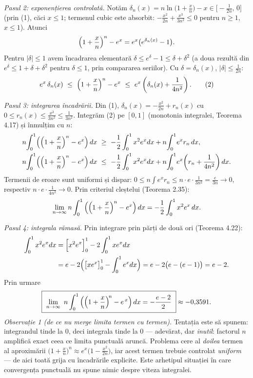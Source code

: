 \emph{Pasul 2: exponențierea controlată.} Notăm $\delta_{n}(x)=n\ln\bigl(1+\frac xn\bigr)-x\in\bigl[-\frac{1}{2n},\,0\bigr]$ (prin (1), căci $x\le1$; termenul cubic este absorbit: $-\frac{x^2}{2n}+\frac{x^3}{3n^2}\le0$ pentru $n\ge1$, $x\le1$). Atunci
\[ \Bigl(1+\frac xn\Bigr)^{n}-e^{x}=e^{x}\bigl(e^{\delta_{n}(x)}-1\bigr) . \]
Pentru $|\delta|\le1$ avem încadrarea elementară $\delta\le e^{\delta}-1\le\delta+\delta^{2}$ (a doua rezultă din $e^{\delta}\le1+\delta+\delta^{2}$ pentru $\delta\le1$, prin compararea seriilor). Cu $\delta=\delta_{n}(x)$, $|\delta|\le\frac{1}{2n}$:
\[ e^{x}\,\delta_{n}(x)\ \le\ \Bigl(1+\frac xn\Bigr)^{n}-e^{x}\ \le\ e^{x}\left(\delta_{n}(x)+\frac{1}{4n^{2}}\right) . \tag{2} \]

\emph{Pasul 3: integrarea încadrării.} Din (1), $\delta_{n}(x)=-\frac{x^{2}}{2n}+r_{n}(x)$ cu $0\le r_{n}(x)\le\frac{x^{3}}{3n^{2}}\le\frac{1}{3n^{2}}$. Integrăm (2) pe $[0,1]$ (monotonia integralei, Teorema 4.17) și înmulțim cu $n$:
\[ \begin{aligned} n\!\int_{0}^{1}\!\left(\Bigl(1+\frac xn\Bigr)^{n}-e^{x}\right)dx&\ \ge\ -\frac12\int_{0}^{1}x^{2}e^{x}dx+n\!\int_{0}^{1}\!e^{x}r_{n}\,dx,\\ n\!\int_{0}^{1}\!\left(\Bigl(1+\frac xn\Bigr)^{n}-e^{x}\right)dx&\ \le\ -\frac12\int_{0}^{1}x^{2}e^{x}dx+n\!\int_{0}^{1}\!e^{x}\!\left(r_{n}+\frac{1}{4n^{2}}\right)dx . \end{aligned} \]
Termenii de eroare sunt uniformi și dispar: $0\le n\int e^{x}r_{n}\le n\cdot e\cdot\frac{1}{3n^{2}}=\frac{e}{3n}\to0$, respectiv $n\cdot e\cdot\frac{1}{4n^{2}}\to0$. Prin criteriul cleștelui (Teorema 2.35):
\[ \lim_{n\to\infty}n\int_{0}^{1}\left(\Bigl(1+\frac xn\Bigr)^{n}-e^{x}\right)dx=-\frac12\int_{0}^{1}x^{2}e^{x}\,dx . \]

\emph{Pasul 4: integrala rămasă.} Prin integrare prin părți de două ori (Teorema 4.22):
\[ \begin{aligned} \int_{0}^{1}x^{2}e^{x}dx&=\Bigl[x^{2}e^{x}\Bigr]_{0}^{1}-2\int_{0}^{1}xe^{x}dx\\ &=e-2\Bigl(\bigl[xe^{x}\bigr]_{0}^{1}-\int_{0}^{1}e^{x}dx\Bigr)=e-2\bigl(e-(e-1)\bigr)=e-2 . \end{aligned} \]
Prin urmare
\[ \boxed{\ \lim_{n\to\infty}\ n\int_{0}^{1}\left(\Bigl(1+\frac{x}{n}\Bigr)^{\!n}-e^{\,x}\right)dx=-\frac{e-2}{2}\ }\approx-0{,}3591 . \]
\emph{Observație 1 (de ce nu merge limita termen cu termen).} Tentația este să spunem: integrandul tinde la $0$, deci integrala tinde la $0$ --- adevărat, dar \emph{inutil}: factorul $n$ amplifică exact ceea ce limita punctuală aruncă. Problema cere al \emph{doilea} termen al aproximării $\bigl(1+\frac xn\bigr)^{n}\approx e^{x}\bigl(1-\frac{x^{2}}{2n}\bigr)$, iar acest termen trebuie controlat \emph{uniform} --- de aici toată grija cu încadrările explicite. Este arhetipul situației în care convergența punctuală nu spune nimic despre viteza integralei.


